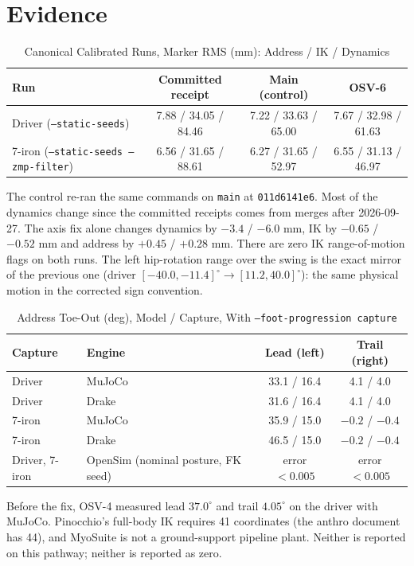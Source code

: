 \documentclass[11pt]{article}
\begin{document}
\section{Evidence}

\begin{table}[h]
\centering
\caption{Canonical Calibrated Runs, Marker RMS (mm): Address / IK / Dynamics}
\label{tab:canon}
\begin{tabular}{lccc}
\toprule
Run & Committed receipt & Main (control) & OSV-6 \\
\midrule
Driver (\texttt{--static-seeds}) & 7.88 / 34.05 / 84.46 & 7.22 / 33.63 / 65.00 & 7.67 / 32.98 / 61.63 \\
7-iron (\texttt{--static-seeds --zmp-filter}) & 6.56 / 31.65 / 88.61 & 6.27 / 31.65 / 52.97 & 6.55 / 31.13 / 46.97 \\
\bottomrule
\end{tabular}
\end{table}

The control re-ran the same commands on \texttt{main} at \texttt{011d6141e6}.
Most of the dynamics change since the committed receipts comes from merges
after 2026-09-27. The axis fix alone changes dynamics by $-3.4$ / $-6.0$ mm,
IK by $-0.65$ / $-0.52$ mm and address by $+0.45$ / $+0.28$ mm. There are
zero IK range-of-motion flags on both runs. The left hip-rotation range over
the swing is the exact mirror of the previous one (driver
$[-40.0, -11.4]^\circ \to [11.2, 40.0]^\circ$): the same physical motion in
the corrected sign convention.

\begin{table}[h]
\centering
\caption{Address Toe-Out (deg), Model / Capture, With \texttt{--foot-progression capture}}
\label{tab:feet}
\begin{tabular}{llcc}
\toprule
Capture & Engine & Lead (left) & Trail (right) \\
\midrule
Driver & MuJoCo & 33.1 / 16.4 & 4.1 / 4.0 \\
Driver & Drake & 31.6 / 16.4 & 4.1 / 4.0 \\
7-iron & MuJoCo & 35.9 / 15.0 & $-0.2$ / $-0.4$ \\
7-iron & Drake & 46.5 / 15.0 & $-0.2$ / $-0.4$ \\
Driver, 7-iron & OpenSim (nominal posture, FK seed) & error $< 0.005$ & error $< 0.005$ \\
\bottomrule
\end{tabular}
\end{table}

Before the fix, OSV-4 measured lead $37.0^\circ$ and trail $4.05^\circ$ on
the driver with MuJoCo. Pinocchio's full-body IK requires 41 coordinates
(the anthro document has 44), and MyoSuite is not a ground-support pipeline
plant. Neither is reported on this pathway; neither is reported as zero.
\end{document}
